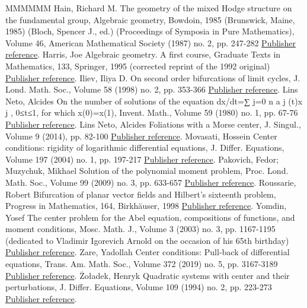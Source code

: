 \begin{thebibliography}{MMMMMM}
 Hain, Richard M. The geometry of the mixed Hodge structure on the fundamental group, Algebraic geometry, Bowdoin, 1985 (Brunswick, Maine, 1985) (Bloch, Spencer J., ed.) (Proceedings of Symposia in Pure Mathematics), Volume 46, American Mathematical Society (1987) no. 2, pp. 247-282 \href{https://ahl.centre-mersenne.org/item/AHL_2020__3__615_0/#hain87}{Publisher reference}.
 Harris, Joe Algebraic geometry. A first course, Graduate Texts in Mathematics, 133, Springer, 1995 (corrected reprint of the 1992 original) \href{https://ahl.centre-mersenne.org/item/AHL_2020__3__615_0/#harr95}{Publisher reference}.
 Iliev, Iliya D. On second order bifurcations of limit cycles, J. Lond. Math. Soc., Volume 58 (1998) no. 2, pp. 353-366 \href{https://ahl.centre-mersenne.org/item/AHL_2020__3__615_0/#ilie98a}{Publisher reference}.
 Lins Neto, Alcides On the number of solutions of the equation dx/dt=∑ j=0 n a j (t)x j , 0≤t≤1, for which x(0)=x(1), Invent. Math., Volume 59 (1980) no. 1, pp. 67-76 \href{https://ahl.centre-mersenne.org/item/AHL_2020__3__615_0/#lins80}{Publisher reference}.
 Lins Neto, Alcides Foliations with a Morse center, J. Singul., Volume 9 (2014), pp. 82-100 \href{https://ahl.centre-mersenne.org/item/AHL_2020__3__615_0/#lins14}{Publisher reference}.
 Movasati, Hossein Center conditions: rigidity of logarithmic differential equations, J. Differ. Equations, Volume 197 (2004) no. 1, pp. 197-217 \href{https://ahl.centre-mersenne.org/item/AHL_2020__3__615_0/#mova04}{Publisher reference}.
 Pakovich, Fedor; Muzychuk, Mikhael Solution of the polynomial moment problem, Proc. Lond. Math. Soc., Volume 99 (2009) no. 3, pp. 633-657 \href{https://ahl.centre-mersenne.org/item/AHL_2020__3__615_0/#pamu09}{Publisher reference}.
 Roussarie, Robert Bifurcation of planar vector fields and Hilbert’s sixteenth problem, Progress in Mathematics, 164, Birkhäuser, 1998 \href{https://ahl.centre-mersenne.org/item/AHL_2020__3__615_0/#rous98}{Publisher reference}.
 Yomdin, Yosef The center problem for the Abel equation, compositions of functions, and moment conditions, Mosc. Math. J., Volume 3 (2003) no. 3, pp. 1167-1195 (dedicated to Vladimir Igorevich Arnold on the occasion of his 65th birthday) \href{https://ahl.centre-mersenne.org/item/AHL_2020__3__615_0/#yomd03}{Publisher reference}.
 Zare, Yadollah Center conditions: Pull-back of differential equations, Trans. Am. Math. Soc., Volume 372 (2019) no. 5, pp. 3167-3189 \href{https://ahl.centre-mersenne.org/item/AHL_2020__3__615_0/#zare19}{Publisher reference}.
 Żoładek, Henryk Quadratic systems with center and their perturbations, J. Differ. Equations, Volume 109 (1994) no. 2, pp. 223-273 \href{https://ahl.centre-mersenne.org/item/AHL_2020__3__615_0/#zola94}{Publisher reference}.
\end{thebibliography}
